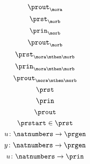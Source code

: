 {\begin{forslides}
\begin{equation}
            \label{eq:mora-prout}
            \prout_{\mora}
        \end{equation}
%
        \begin{equation}
            \label{eq:morb-prst}
            \prst_{\morb}
        \end{equation}
%
        \begin{equation}
            \label{eq:morb-prin}
            \prin_{\morb}
        \end{equation}
%
        \begin{equation}
            \label{eq:morb-prout}
            \prout_{\morb}
        \end{equation}
%
        \begin{equation}
            \label{eq:morab-prst}
            \prst_{\mora\mthen\morb}
        \end{equation}
%
        \begin{equation}
            \label{eq:morab-prin}
            \prin_{\mora\mthen\morb}
        \end{equation}
%
        \begin{equation}
            \label{eq:morab-prout}
            \prout_{\mora\mthen\morb}
        \end{equation}
%
        \begin{equation}
            \label{eq:gen-prst}
            \prst
        \end{equation}
%
        \begin{equation}
            \label{eq:gen-prin}
            \prin
        \end{equation}
        \begin{equation}
            \label{eq:gen-prout}
            \prout
        \end{equation}
        \begin{equation}
            \label{eq:moore-start}
            \prstart \in \prst
        \end{equation}
%
        \begin{equation}
            \label{eq:prgen-u}
            u\colon \natnumbers \to \prgen
        \end{equation}
%
        \begin{equation}
            \label{eq:prgen-y}
            y\colon \natnumbers \to \prgen
        \end{equation}
%
        \begin{equation}
            \label{eq:prgen-u-1}
            u\colon \natnumbers \to \prin
        \end{equation}

\end{forslides}}
